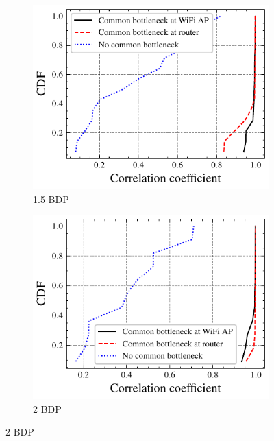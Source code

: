 \begin{figure}
  \begin{subfigure}{0.49\textwidth}
    \centering
    \includegraphics[width=\textwidth]{figures/bdp/double-cdf-bdp-15-no-only-video.pdf}
    \caption{\label{subfig:bdp-15}1.5 BDP}
  \end{subfigure}%
  \begin{subfigure}{0.49\textwidth}
    \centering
    \includegraphics[width=\textwidth]{figures/bdp/double-cdf-bdp-20-no-only-video.pdf}
    \caption{\label{subfig:bdp-20}2 BDP}
  \end{subfigure}%
\end{figure}
